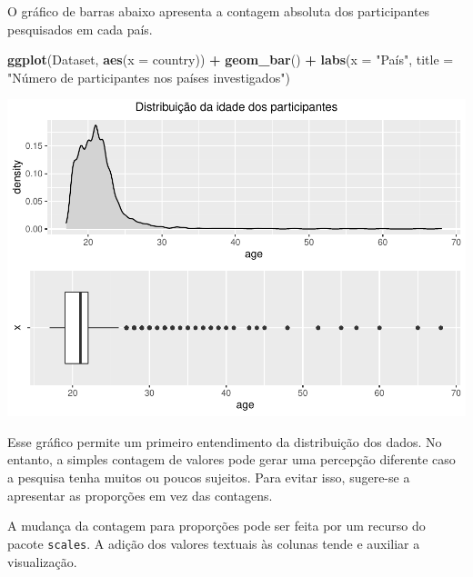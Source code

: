 \documentclass[
]{book}
\newenvironment{Shaded}{\begin{snugshade}}{\end{snugshade}}
\newcommand{\DataTypeTok}[1]{\textcolor[rgb]{0.13,0.29,0.53}{#1}}
\newcommand{\KeywordTok}[1]{\textcolor[rgb]{0.13,0.29,0.53}{\textbf{#1}}}
\newcommand{\NormalTok}[1]{#1}
\newcommand{\OperatorTok}[1]{\textcolor[rgb]{0.81,0.36,0.00}{\textbf{#1}}}
\newcommand{\StringTok}[1]{\textcolor[rgb]{0.31,0.60,0.02}{#1}}
\begin{document}
O gráfico de barras abaixo apresenta a contagem absoluta dos participantes pesquisados em cada país.

\begin{Shaded}
\begin{Highlighting}[]
\KeywordTok{ggplot}\NormalTok{(Dataset, }\KeywordTok{aes}\NormalTok{(}\DataTypeTok{x =}\NormalTok{ country)) }\OperatorTok{+}
\StringTok{  }\KeywordTok{geom_bar}\NormalTok{() }\OperatorTok{+}
\StringTok{  }\KeywordTok{labs}\NormalTok{(}\DataTypeTok{x =} \StringTok{"País"}\NormalTok{, }\DataTypeTok{title =} \StringTok{"Número de participantes nos países investigados"}\NormalTok{)}
\end{Highlighting}
\end{Shaded}

\begin{center}\includegraphics{gitbook-demo_files/figure-latex/unnamed-chunk-19-1} \end{center}

Esse gráfico permite um primeiro entendimento da distribuição dos dados. No entanto, a simples contagem de valores pode gerar uma percepção diferente caso a pesquisa tenha muitos ou poucos sujeitos. Para evitar isso, sugere-se a apresentar as proporções em vez das contagens.

A mudança da contagem para proporções pode ser feita por um recurso do pacote \texttt{scales}. A adição dos valores textuais às colunas tende e auxiliar a visualização.
\end{document}
